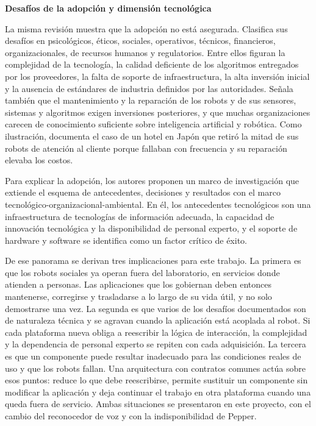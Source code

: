 \documentclass[11pt,letterpaper]{article}
\begin{document}
\par\medskip\noindent\textbf{Desafíos de la adopción y dimensión tecnológica}\par

La misma revisión muestra que la adopción no está asegurada. Clasifica sus desafíos en psicológicos, éticos, sociales, operativos, técnicos, financieros, organizacionales, de recursos humanos y regulatorios. Entre ellos figuran la complejidad de la tecnología, la calidad deficiente de los algoritmos entregados por los proveedores, la falta de soporte de infraestructura, la alta inversión inicial y la ausencia de estándares de industria definidos por las autoridades. Señala también que el mantenimiento y la reparación de los robots y de sus sensores, sistemas y algoritmos exigen inversiones posteriores, y que muchas organizaciones carecen de conocimiento suficiente sobre inteligencia artificial y robótica. Como ilustración, documenta el caso de un hotel en Japón que retiró la mitad de sus robots de atención al cliente porque fallaban con frecuencia y su reparación elevaba los costos.

Para explicar la adopción, los autores proponen un marco de investigación que extiende el esquema de antecedentes, decisiones y resultados con el marco tecnológico-organizacional-ambiental. En él, los antecedentes tecnológicos son una infraestructura de tecnologías de información adecuada, la capacidad de innovación tecnológica y la disponibilidad de personal experto, y el soporte de hardware y software se identifica como un factor crítico de éxito.

De ese panorama se derivan tres implicaciones para este trabajo. La primera es que los robots sociales ya operan fuera del laboratorio, en servicios donde atienden a personas. Las aplicaciones que los gobiernan deben entonces mantenerse, corregirse y trasladarse a lo largo de su vida útil, y no solo demostrarse una vez. La segunda es que varios de los desafíos documentados son de naturaleza técnica y se agravan cuando la aplicación está acoplada al robot. Si cada plataforma nueva obliga a reescribir la lógica de interacción, la complejidad y la dependencia de personal experto se repiten con cada adquisición. La tercera es que un componente puede resultar inadecuado para las condiciones reales de uso y que los robots fallan. Una arquitectura con contratos comunes actúa sobre esos puntos: reduce lo que debe reescribirse, permite sustituir un componente sin modificar la aplicación y deja continuar el trabajo en otra plataforma cuando una queda fuera de servicio. Ambas situaciones se presentaron en este proyecto, con el cambio del reconocedor de voz y con la indisponibilidad de Pepper.
\end{document}
